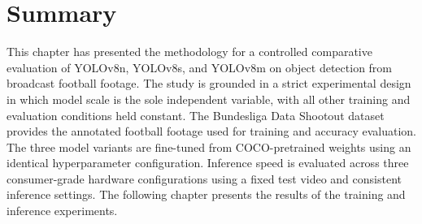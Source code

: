 \section{Summary}

This chapter has presented the methodology for a controlled comparative evaluation of YOLOv8n, YOLOv8s, and YOLOv8m on object detection from broadcast football footage. The study is grounded in a strict experimental design in which model scale is the sole independent variable, with all other training and evaluation conditions held constant. The Bundesliga Data Shootout dataset provides the annotated football footage used for training and accuracy evaluation. The three model variants are fine-tuned from COCO-pretrained weights using an identical hyperparameter configuration. Inference speed is evaluated across three consumer-grade hardware configurations using a fixed test video and consistent inference settings. The following chapter presents the results of the training and inference experiments.